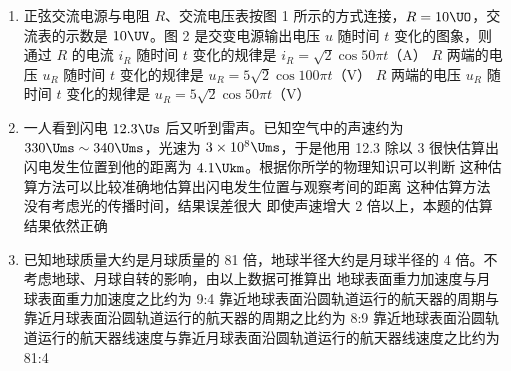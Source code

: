 \documentclass[\gkver]{gaokaozhenti}
\begin{document}
\begin{enumerate}
\item
正弦交流电源与电阻 $R$、交流电压表按图 1 所示的方式连接，$R=10\UO$，交流表的示数是 $10\UV$。图 2 是交变电源输出电压 $u$ 随时间 $t$ 变化的图象，则
{通过 $R$ 的电流 $i_{R}$ 随时间 $t$ 变化的规律是 $i_{R}=\sqrt{2}\cos50\pi t$（A）}
{$R$ 两端的电压 $u_{R}$ 随时间 $t$ 变化的规律是 $u_{R}=5\sqrt{2}\cos100\pi t$（V）}
{$R$ 两端的电压 $u_{R}$ 随时间 $t$ 变化的规律是 $u_{R}=5\sqrt{2}\cos50\pi t$（V）}

\item
一人看到闪电 $12.3\Us$ 后又听到雷声。已知空气中的声速约为 $330\Ums\sim340\Ums$，光速为 $3\times10^{8}\Ums$，于是他用 12.3 除以 3 很快估算出闪电发生位置到他的距离为 $4.1\Ukm$。根据你所学的物理知识可以判断
{这种估算方法可以比较准确地估算出闪电发生位置与观察考间的距离}
{这种估算方法没有考虑光的传播时间，结果误差很大}
{即使声速增大 2 倍以上，本题的估算结果依然正确}

\item
已知地球质量大约是月球质量的 81 倍，地球半径大约是月球半径的 4 倍。不考虑地球、月球自转的影响，由以上数据可推算出
{地球表面重力加速度与月球表面重力加速度之比约为 9:4}
{靠近地球表面沿圆轨道运行的航天器的周期与靠近月球表面沿圆轨道运行的航天器的周期之比约为 8:9}
{靠近地球表面沿圆轨道运行的航天器线速度与靠近月球表面沿圆轨道运行的航天器线速度之比约为 81:4}


\end{enumerate}
\end{document}
